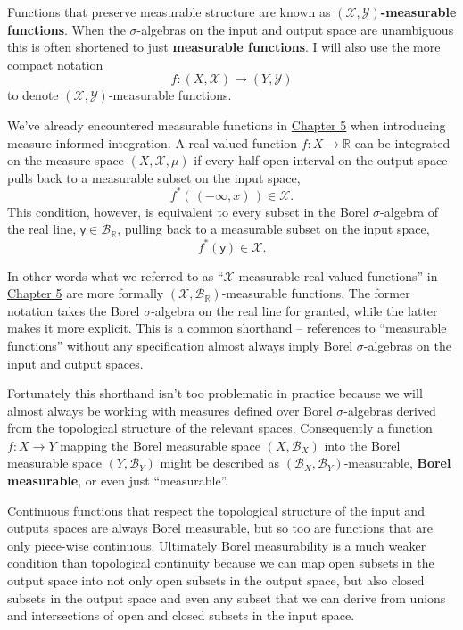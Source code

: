 \documentclass[
  letterpaper,
  DIV=11,
  numbers=noendperiod]{scrartcl}
\begin{document}
Functions that preserve measurable structure are known as
\textbf{\((\mathcal{X}, \mathcal{Y})\)-measurable functions}. When the
\(\sigma\)-algebras on the input and output space are unambiguous this
is often shortened to just \textbf{measurable functions}. I will also
use the more compact notation \[
f : (X, \mathcal{X}) \rightarrow (Y, \mathcal{Y})
\] to denote \((\mathcal{X}, \mathcal{Y})\)-measurable functions.

We've already encountered measurable functions in
\href{https://betanalpha.github.io/assets/chapters_html/expectation_values.html}{Chapter
5} when introducing measure-informed integration. A real-valued function
\(f : X \rightarrow \mathbb{R}\) can be integrated on the measure space
\((X, \mathcal{X}, \mu)\) if every half-open interval on the output
space pulls back to a measurable subset on the input space, \[
f^{*}( \, (-\infty, x) \, ) \in \mathcal{X}.
\] This condition, however, is equivalent to every subset in the Borel
\(\sigma\)-algebra of the real line,
\(\mathsf{y} \in \mathcal{B}_{\mathbb{R}}\), pulling back to a
measurable subset on the input space, \[
f^{*}( \mathsf{y} ) \in \mathcal{X}.
\]

In other words what we referred to as ``\(\mathcal{X}\)-measurable
real-valued functions'' in
\href{https://betanalpha.github.io/assets/chapters_html/expectation_values.html}{Chapter
5} are more formally
\((\mathcal{X}, \mathcal{B}_{\mathbb{R}})\)-measurable functions. The
former notation takes the Borel \(\sigma\)-algebra on the real line for
granted, while the latter makes it more explicit. This is a common
shorthand -- references to ``measurable functions'' without any
specification almost always imply Borel \(\sigma\)-algebras on the input
and output spaces.

Fortunately this shorthand isn't too problematic in practice because we
will almost always be working with measures defined over Borel
\(\sigma\)-algebras derived from the topological structure of the
relevant spaces. Consequently a function \(f : X \rightarrow Y\) mapping
the Borel measurable space \((X, \mathcal{B}_{X})\) into the Borel
measurable space \((Y, \mathcal{B}_{Y})\) might be described as
\((\mathcal{B}_{X}, \mathcal{B}_{Y})\)-measurable, \textbf{Borel
measurable}, or even just ``measurable''.

Continuous functions that respect the topological structure of the input
and outputs spaces are always Borel measurable, but so too are functions
that are only piece-wise continuous. Ultimately Borel measurability is a
much weaker condition than topological continuity because we can map
open subsets in the output space into not only open subsets in the
output space, but also closed subsets in the output space and even any
subset that we can derive from unions and intersections of open and
closed subsets in the input space.
\end{document}
